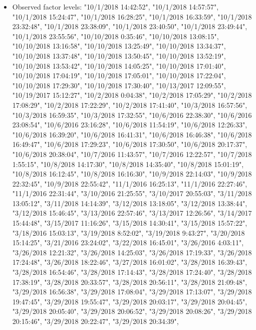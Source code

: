 \documentclass[]{article}
\providecommand{\tightlist}{%
  \setlength{\itemsep}{0pt}\setlength{\parskip}{0pt}}
\begin{document}
\begin{itemize}
\tightlist
\item
  Observed factor levels: "10/1/2018 14:42:52", "10/1/2018 14:57:57",
  "10/1/2018 15:24:47", "10/1/2018 16:28:25", "10/1/2018 16:33:59",
  "10/1/2018 23:32:48", "10/1/2018 23:38:09", "10/1/2018 23:40:50",
  "10/1/2018 23:49:44", "10/1/2018 23:55:56", "10/10/2018 0:35:46",
  "10/10/2018 13:08:15", "10/10/2018 13:16:58", "10/10/2018 13:25:49",
  "10/10/2018 13:34:37", "10/10/2018 13:37:48", "10/10/2018 13:50:45",
  "10/10/2018 13:52:19", "10/10/2018 13:53:42", "10/10/2018 14:05:25",
  "10/10/2018 17:01:40", "10/10/2018 17:04:19", "10/10/2018 17:05:01",
  "10/10/2018 17:22:04", "10/10/2018 17:29:30", "10/10/2018 17:30:40",
  "10/13/2017 12:09:55", "10/19/2017 15:12:27", "10/2/2018 0:04:38",
  "10/2/2018 17:05:29", "10/2/2018 17:08:29", "10/2/2018 17:22:29",
  "10/2/2018 17:41:40", "10/3/2018 16:57:56", "10/3/2018 16:59:35",
  "10/3/2018 17:32:55", "10/6/2016 22:38:30", "10/6/2016 23:08:54",
  "10/6/2016 23:16:28", "10/6/2018 11:54:19", "10/6/2018 12:26:33",
  "10/6/2018 16:39:20", "10/6/2018 16:41:31", "10/6/2018 16:46:38",
  "10/6/2018 16:49:47", "10/6/2018 17:29:23", "10/6/2018 17:30:50",
  "10/6/2018 20:17:37", "10/6/2018 20:38:04", "10/7/2016 11:43:57",
  "10/7/2016 12:22:57", "10/7/2018 1:55:15", "10/8/2018 14:17:30",
  "10/8/2018 14:35:40", "10/8/2018 15:01:19", "10/8/2018 16:12:45",
  "10/8/2018 16:16:30", "10/9/2018 22:14:03", "10/9/2018 22:32:45",
  "10/9/2018 22:55:42", "11/1/2016 16:25:13", "11/1/2016 22:27:46",
  "11/1/2016 22:31:44", "3/10/2016 21:25:55", "3/10/2017 20:55:03",
  "3/11/2018 13:05:12", "3/11/2018 14:14:39", "3/12/2018 13:18:05",
  "3/12/2018 13:38:44", "3/12/2018 15:46:45", "3/13/2016 22:57:46",
  "3/13/2017 12:26:56", "3/14/2017 15:44:48", "3/15/2017 11:16:26",
  "3/15/2018 14:30:41", "3/15/2018 15:57:22", "3/18/2016 15:03:13",
  "3/19/2018 8:52:02", "3/19/2018 9:43:27", "3/20/2018 15:14:25",
  "3/21/2016 23:24:02", "3/22/2018 16:45:01", "3/26/2016 4:03:11",
  "3/26/2018 12:21:32", "3/26/2018 14:25:03", "3/26/2018 17:19:33",
  "3/26/2018 17:24:48", "3/26/2018 18:22:46", "3/27/2018 16:01:02",
  "3/28/2018 16:39:43", "3/28/2018 16:54:46", "3/28/2018 17:14:43",
  "3/28/2018 17:24:40", "3/28/2018 17:38:19", "3/28/2018 20:33:57",
  "3/28/2018 20:56:11", "3/28/2018 21:09:48", "3/29/2018 16:56:38",
  "3/29/2018 17:08:04", "3/29/2018 17:13:07", "3/29/2018 19:47:45",
  "3/29/2018 19:55:47", "3/29/2018 20:03:17", "3/29/2018 20:04:45",
  "3/29/2018 20:05:40", "3/29/2018 20:06:52", "3/29/2018 20:08:26",
  "3/29/2018 20:15:46", "3/29/2018 20:22:47", "3/29/2018 20:34:39",

\end{itemize}
\end{document}
